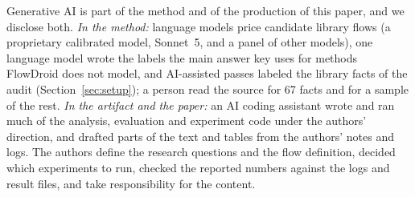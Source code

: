Generative AI is part of the method and of the production of this paper, and we disclose both.
\emph{In the method:} language models price candidate library flows (a proprietary calibrated model, Sonnet~5, and a panel of other models), one language model wrote the labels the main answer key uses for methods FlowDroid does not model, and AI-assisted passes labeled the library facts of the audit (Section~\ref{sec:setup}); a person read the source for 67 facts and for a sample of the rest.
\emph{In the artifact and the paper:} an AI coding assistant wrote and ran much of the analysis, evaluation and experiment code under the authors' direction, and drafted parts of the text and tables from the authors' notes and logs.
The authors define the research questions and the flow definition, decided which experiments to run, checked the reported numbers against the logs and result files, and take responsibility for the content.
